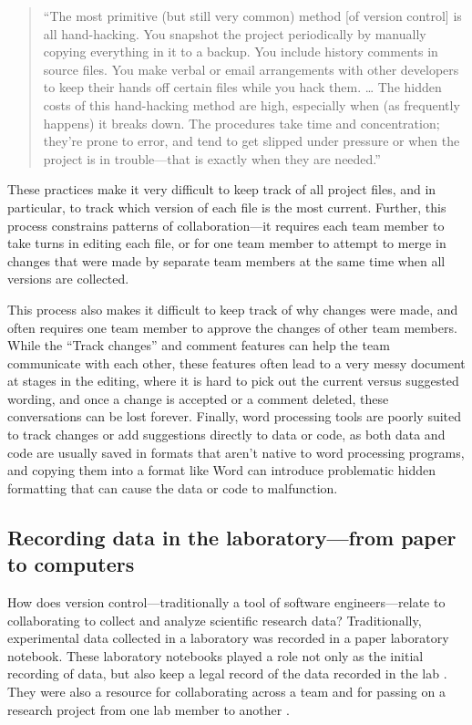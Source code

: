 \documentclass[]{tufte-book}
\begin{document}
\begin{quote}
``The most primitive (but still very common) method {[}of version control{]} is all
hand-hacking. You snapshot the project periodically by manually copying
everything in it to a backup. You include history comments in source files. You
make verbal or email arrangements with other developers to keep their hands off
certain files while you hack them. \ldots{} The hidden costs of this hand-hacking
method are high, especially when (as frequently happens) it breaks down. The
procedures take time and concentration; they're prone to error, and tend to get
slipped under pressure or when the project is in trouble---that is exactly when
they are needed.'' \citep{raymond2003art}
\end{quote}

These practices make it very difficult to keep track of all project files, and
in particular, to track which version of each file is the most current. Further,
this process constrains patterns of collaboration---it requires each team member
to take turns in editing each file, or for one team member to attempt to merge
in changes that were made by separate team members at the same time when all
versions are collected.

This process also makes it difficult to keep track of why changes were made, and
often requires one team member to approve the changes of other team members.
While the ``Track changes'' and comment features can help the team communicate
with each other, these features often lead to a very messy document at stages in
the editing, where it is hard to pick out the current versus suggested wording,
and once a change is accepted or a comment deleted, these conversations can be
lost forever. Finally, word processing tools are poorly suited to track changes
or add suggestions directly to data or code, as both data and code are usually
saved in formats that aren't native to word processing programs, and copying
them into a format like Word can introduce problematic hidden formatting that
can cause the data or code to malfunction.

\subsection{Recording data in the laboratory---from paper to computers}\label{recording-data-in-the-laboratoryfrom-paper-to-computers}

How does version control---traditionally a tool of software engineers---relate
to collaborating to collect and analyze scientific research data? Traditionally,
experimental data collected in a laboratory was recorded in a paper laboratory
notebook. These laboratory notebooks played a role not only as the initial
recording of data, but also keep a legal record of the data recorded in the lab
\citep{mascarelli2014research}. They were also a resource for collaborating across a
team and for passing on a research project from one lab member to another
\citep{butler2005electronic}.
\end{document}
